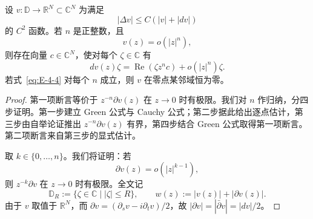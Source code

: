 \begin{proposition}\label{prop:E-4-3}
设 $v:\mathbb D\to\mathbb R^N\subset\mathbb C^N$ 为满足
\begin{equation}\label{eq:E-4-3}
  |\Delta v|\le C(|v|+|dv|)
\end{equation}
的 $C^2$ 函数。若 $n$ 是正整数，且
\begin{equation}\label{eq:E-4-4}
  v(z)=o(|z|^n),
\end{equation}
则存在向量 $c\in\mathbb C^N$，使对每个 $\zeta\in\mathbb C$ 有
\[
  dv(z)\zeta=\operatorname{Re}(\zeta z^nc)+o(|z|^n)\zeta.
\]
若式~\eqref{eq:E-4-4} 对每个 $n$ 成立，则 $v$ 在零点某邻域恒为零。
\end{proposition}

\begin{proof}
第一项断言等价于 $z^{-n}\partial v(z)$ 在 $z\to0$ 时有极限。我们对 $n$ 作归纳，分四步证明。第一步建立 Green 公式与 Cauchy 公式；第二步据此给出逐点估计，第三步由自举论证推出 $z^{-n}\partial v(z)$ 有界，第四步结合 Green 公式取得第一项断言。第二项断言来自第三步的显式估计。

取 $k\in\{0,\ldots,n\}$。我们将证明：若
\begin{equation}\label{eq:E-4-5}
  \partial v(z)=o(|z|^{k-1}),
\end{equation}
则 $z^{-k}\partial v$ 在 $z\to0$ 时有极限。全文记
\[
  \mathbb D_R:=\{\zeta\in\mathbb C\mid|\zeta|\le R\},
  \qquad w(z):=|v(z)|+|\partial v(z)|.
\]
由于 $v$ 取值于 $\mathbb R^N$，而 $\partial v=(\partial_sv-i\partial_tv)/2$，故 $|\partial v|=|\bar\partial v|=|dv|/2$。


\end{proof}
